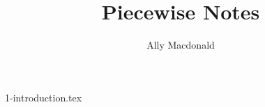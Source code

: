 \documentclass[10pt,a4paper]{article}
\title{Piecewise Notes}
\author{Ally Macdonald}
\date{}
\begin{document}
\maketitle
\tableofcontents
\newpage

{1-introduction.tex}
\end{document}

